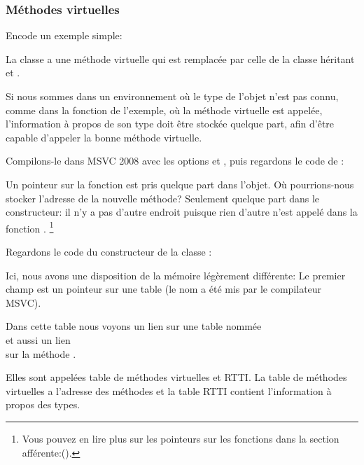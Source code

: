 \subsubsection{Méthodes virtuelles}

Encode un exemple simple:




La classe  a une méthode virtuelle  qui est remplacée par celle
de la classe héritant  et .


Si nous sommes dans un environnement où le type de l'objet n'est pas connu, comme
dans la fonction \main de l'exemple, où la méthode virtuelle  est appelée,
l'information à propos de son type doit être stockée quelque part, afin d'être capable
d'appeler la bonne méthode virtuelle.


Compilons-le dans MSVC 2008 avec les options \Ox et \Obzero, puis regardons le code
de \main:




Un pointeur sur la fonction  est pris quelque part dans l'objet.
Où pourrions-nous stocker l'adresse de la nouvelle méthode?
Seulement quelque part dans le constructeur: il n'y a pas d'autre endroit puisque rien
d'autre n'est appelé dans la fonction \main.
\footnote{Vous pouvez en lire plus sur les pointeurs sur les fonctions dans la section afférente:().}


Regardons le code du constructeur de la classe :




Ici, nous avons une disposition de la mémoire légèrement différente:
Le premier champ est un pointeur sur une table  (le nom a été
mis par le compilateur MSVC).

\label{RTTI}

Dans cette table nous voyons un lien sur une table nommée \\
 et aussi un lien \\
sur la méthode .

Elles sont appelées table de méthodes virtuelles et \ac{RTTI}.
La table de méthodes virtuelles a l'adresse des méthodes et la table \ac{RTTI} contient
l'information à propos des types.

